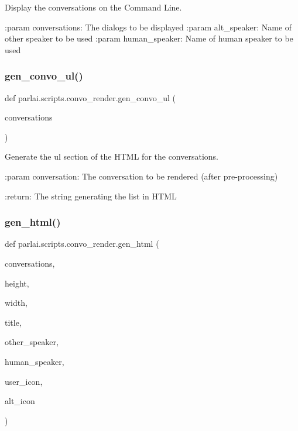 \begin{DoxyVerb}Display the conversations on the Command Line.

:param conversations: The dialogs to be displayed
:param alt_speaker: Name of other speaker to be used
:param human_speaker: Name of human speaker to be used
\end{DoxyVerb}
 \mbox{\label{namespaceparlai_1_1scripts_1_1convo__render_a8c393321c36d1cafceb86aa3f7431c4c}} 
\subsubsection{\texorpdfstring{gen\+\_\+convo\+\_\+ul()}{gen\_convo\_ul()}}
{\footnotesize\ttfamily def parlai.\+scripts.\+convo\+\_\+render.\+gen\+\_\+convo\+\_\+ul (\begin{DoxyParamCaption}\item[{}]{conversations }\end{DoxyParamCaption})}

\begin{DoxyVerb}Generate the ul section of the HTML for the conversations.

:param conversation: The conversation to be rendered (after pre-processing)

:return: The string generating the list in HTML
\end{DoxyVerb}
 \mbox{\label{namespaceparlai_1_1scripts_1_1convo__render_ad23695f4d64e7dbd1fee801098d570b2}} 
\subsubsection{\texorpdfstring{gen\+\_\+html()}{gen\_html()}}
{\footnotesize\ttfamily def parlai.\+scripts.\+convo\+\_\+render.\+gen\+\_\+html (\begin{DoxyParamCaption}\item[{}]{conversations,  }\item[{}]{height,  }\item[{}]{width,  }\item[{}]{title,  }\item[{}]{other\+\_\+speaker,  }\item[{}]{human\+\_\+speaker,  }\item[{}]{user\+\_\+icon,  }\item[{}]{alt\+\_\+icon }\end{DoxyParamCaption})}

